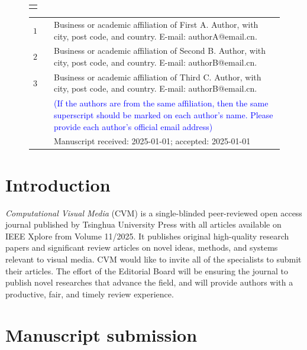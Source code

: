 \documentclass{CVM}
\begin{document}
\maketitle

\enlargethispage{-3pt}
\begin{figure}[b] \vskip -4mm
\small\renewcommand{}
\begin{tabular}{p{80.5mm}} \toprule\\ \end{tabular}
\vskip -4.5mm \noindent \setlength{\tabcolsep}{1pt}
\begin{tabular}{p{3.5mm}p{80mm}}
$1\quad $ & Business or academic affiliation of First A. Author, with city, post code, and country. E-mail: authorA@email.cn.\\
$2\quad $ & Business or academic affiliation of Second B. Author, with city, post code, and country. E-mail: authorB@email.cn.\\
$3\quad $ & Business or academic affiliation of Third C. Author, with city, post code, and country. E-mail: authorB@email.cn.\\
&{\textcolor{blue} {(If the authors are from the same affiliation, then the same superscript should be marked on each author's name. Please provide each author's official email address)}}\\
&\hspace{-5mm} Manuscript received: 2025-01-01; accepted: 2025-01-01\vspace{-2mm}
\end{tabular} \vspace {-3mm}
\end{figure}

\section{Introduction}

\textit{Computational Visual Media} (CVM) is a single-blinded peer-reviewed open access journal published by
Tsinghua University Press with all articles available on IEEE Xplore from Volume 11/2025. It publishes original high-quality
research papers and significant review articles on novel ideas, methods, and
systems relevant to visual media. CVM would like to invite all of the
specialists to submit their articles. The effort of the Editorial Board will
be ensuring the journal to publish novel researches that advance the field,
and will provide authors with a productive, fair, and timely review
experience.

\section{Manuscript submission}
\end{document}
